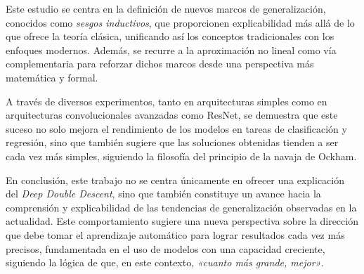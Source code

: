 Este estudio se centra en la definición de nuevos marcos de generalización, conocidos como \emph{sesgos inductivos}, que proporcionen explicabilidad más allá de lo que ofrece la teoría clásica, unificando así los conceptos tradicionales con los enfoques modernos. Además, se recurre a la aproximación no lineal como vía complementaria para reforzar dichos marcos desde una perspectiva más matemática y formal.

A través de diversos experimentos, tanto en arquitecturas simples como en arquitecturas convolucionales avanzadas como ResNet, se demuestra que este suceso no solo mejora el rendimiento de los modelos en tareas de clasificación y regresión, sino que también sugiere que las soluciones obtenidas tienden a ser cada vez más simples, siguiendo la filosofía del principio de la navaja de Ockham.

En conclusión, este trabajo no se centra únicamente en ofrecer una explicación del \emph{Deep Double Descent}, sino que también constituye un avance hacia la comprensión y explicabilidad de las tendencias de generalización observadas en la actualidad. Este comportamiento sugiere una nueva perspectiva sobre la dirección que debe tomar el aprendizaje automático para lograr resultados cada vez más precisos, fundamentada en el uso de modelos con una capacidad creciente, siguiendo la lógica de que, en este contexto, \emph{«cuanto más grande, mejor»}.

